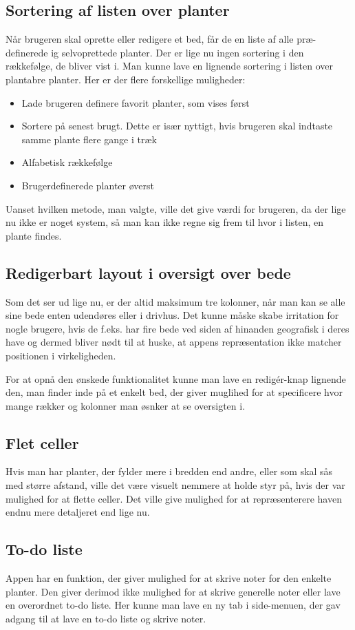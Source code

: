 \subsection{Sortering af listen over planter}
Når brugeren skal oprette eller redigere et bed, får de en liste af alle præ-definerede ig selvoprettede planter. Der er lige nu ingen sortering i den rækkefølge, de bliver vist i.  Man kunne lave en lignende sortering i listen over plantabre planter. Her er der flere forskellige muligheder:
\begin{itemize}
   \item Lade brugeren definere favorit planter, som vises først
   \item Sortere på senest brugt. Dette er især nyttigt, hvis brugeren skal indtaste samme plante flere gange i træk
   \item Alfabetisk rækkefølge
   \item Brugerdefinerede planter øverst
\end{itemize}

Uanset hvilken metode, man valgte, ville det give værdi for brugeren, da der lige nu ikke er noget system, så man kan ikke regne sig frem til hvor i listen, en plante findes.

\subsection{Redigerbart layout i oversigt over bede}
Som det ser ud lige nu, er der altid maksimum tre kolonner, når man kan se alle sine bede enten udendøres eller i drivhus. Det kunne måske skabe irritation for nogle brugere, hvis de f.eks. har fire bede ved siden af hinanden geografisk i deres have og dermed bliver nødt til at huske, at appens repræsentation ikke matcher positionen i virkeligheden. 

For at opnå den ønskede funktionalitet kunne man lave en redigér-knap lignende den, man finder inde på et enkelt bed, der giver muglihed for at specificere hvor mange rækker og kolonner man øsnker at se oversigten i.

\subsection{Flet celler}
Hvis man har planter, der fylder mere i bredden end andre, eller som skal sås med større afstand, ville det være visuelt nemmere at holde styr på, hvis der var mulighed for at flette celler. Det ville give mulighed for at repræsenterere haven endnu mere detaljeret end lige nu.

\subsection{To-do liste}
Appen har en funktion, der giver mulighed for at skrive noter for den enkelte planter. Den giver derimod ikke mulighed for at skrive generelle noter eller lave en overordnet to-do liste. Her kunne man lave en ny tab i side-menuen, der gav adgang til at lave en to-do liste og skrive noter.
